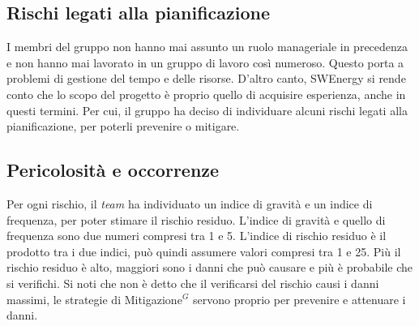 \subsection{Rischi legati alla pianificazione}
I membri del gruppo non hanno mai assunto un ruolo manageriale in
precedenza e non hanno mai lavorato in un gruppo di lavoro così
numeroso. Questo porta a problemi di gestione del tempo e delle
risorse. D'altro canto, SWEnergy si rende conto che lo scopo del
progetto è proprio quello di acquisire esperienza, anche in questi
termini. Per cui, il gruppo ha deciso di individuare alcuni
rischi legati alla pianificazione, per poterli prevenire o mitigare.






\subsection{Pericolosità e occorrenze}

Per ogni rischio, il \textit{team} ha individuato un indice di gravità e un
indice di frequenza, per poter stimare il rischio residuo. L'indice di
gravità e quello di frequenza sono due numeri compresi tra 1 e 5. L'indice di
rischio residuo è il prodotto tra i due indici, può quindi assumere valori
compresi tra 1 e 25. Più il rischio residuo è alto, maggiori sono i danni che
può causare e più è probabile che si verifichi. Si noti che non è detto che il
verificarsi del rischio causi i danni massimi, le strategie di
\gls{Mitigazione}$^G$ servono proprio per prevenire e attenuare i danni.


